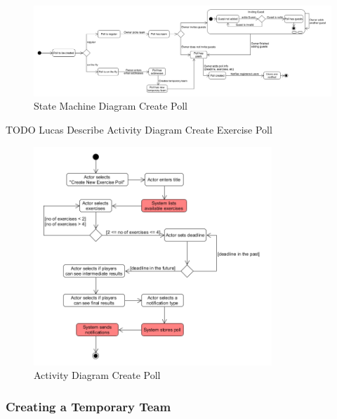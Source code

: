 \begin{figure}[H]
    \begin{center}
        \includegraphics[width=1\textwidth]{images/diagrams/state_machine_diagrams/StateDiagram_CreatePoll.png}
        \caption{State Machine Diagram Create Poll}
        \label{fig:state_machine_diagram_create_poll}
    \end{center}
\end{figure}

TODO Lucas Describe Activity Diagram Create Exercise Poll

\begin{figure}[H]
    \begin{center}
        \includegraphics[width=0.8\textwidth]{images/diagrams/activity_diagrams/ActivityDiagram_CreateExercisePoll.png}
        \caption{Activity Diagram Create Poll}
        \label{fig:activity_diagram_create_poll}
    \end{center}
\end{figure}

\subsubsection{Creating a Temporary Team}
\label{sssec:creating_temp_team}

